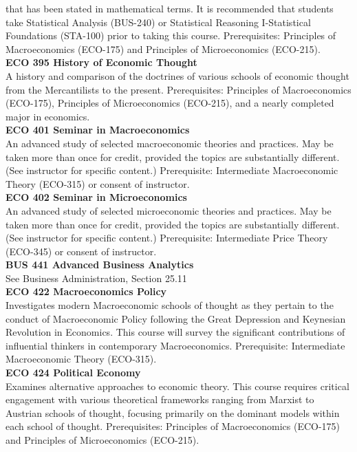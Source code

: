 \documentclass[
  letterpaper,
]{scrbook}
\begin{document}
that has been stated in mathematical terms. It is recommended that
students take Statistical Analysis (BUS-240) or Statistical Reasoning
I-Statistical Foundations (STA-100) prior to taking this course.
Prerequisites: Principles of Macroeconomics (ECO-175) and Principles of
Microeconomics (ECO-215).\\
\textbf{ECO 395 History of Economic Thought}\\
A history and comparison of the doctrines of various schools of economic
thought from the Mercantilists to the present. Prerequisites: Principles
of Macroeconomics (ECO-175), Principles of Microeconomics (ECO-215), and
a nearly completed major in economics.\\
\textbf{ECO 401 Seminar in Macroeconomics}\\
An advanced study of selected macroeconomic theories and practices. May
be taken more than once for credit, provided the topics are
substantially different. (See instructor for specific content.)
Prerequisite: Intermediate Macroeconomic Theory (ECO-315) or consent of
instructor.\\
\textbf{ECO 402 Seminar in Microeconomics}\\
An advanced study of selected microeconomic theories and practices. May
be taken more than once for credit, provided the topics are
substantially different. (See instructor for specific content.)
Prerequisite: Intermediate Price Theory (ECO-345) or consent of
instructor.\\
\textbf{BUS 441 Advanced Business Analytics}\\
See Business Administration, Section 25.11\\
\textbf{ECO 422 Macroeconomics Policy}\\
Investigates modern Macroeconomic schools of thought as they pertain to
the conduct of Macroeconomic Policy following the Great Depression and
Keynesian Revolution in Economics. This course will survey the
significant contributions of influential thinkers in contemporary
Macroeconomics. Prerequisite: Intermediate Macroeconomic Theory
(ECO-315).\\
\textbf{ECO 424 Political Economy}\\
Examines alternative approaches to economic theory. This course requires
critical engagement with various theoretical frameworks ranging from
Marxist to Austrian schools of thought, focusing primarily on the
dominant models within each school of thought. Prerequisites: Principles
of Macroeconomics (ECO-175) and Principles of Microeconomics
(ECO-215).\\
\end{document}
